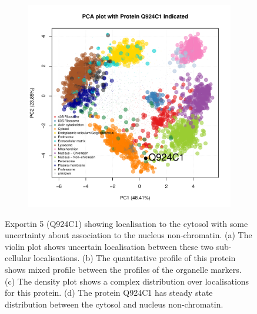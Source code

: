 \documentclass[12pt,english]{article}\usepackage[]{graphicx}\usepackage[]{color}
\makeatletter
\def\maxwidth{ %
  \ifdim\Gin@nat@width>\linewidth
    \linewidth
  \else
    \Gin@nat@width
  \fi
}
\newenvironment{knitrout}{}{} %
\makeatother
\begin{document}
\begin{figure}[h]
\begin{subfigure}[t]{0.5\textwidth}
\begin{knitrout}
{}



\end{knitrout}
    \caption{}
  \end{subfigure}%
  \begin{subfigure}[t]{0.5\textwidth}
    \centering
\begin{knitrout}
\color{fgcolor}
\includegraphics[width=\maxwidth]{figure/unnamed-chunk-15-1} 

\end{knitrout}
    \caption{}
  \end{subfigure}

  \caption{Exportin 5 (Q924C1) showing localisation to the cytosol
    with some uncertainty about association to the nucleus
    non-chromatin.  (a) The violin plot shows uncertain localisation
    between these two sub-cellular localisations. (b) The quantitative
    profile of this protein shows mixed profile between the profiles
    of the organelle markers. (c) The density plot shows a complex
    distribution over localisations for this protein. (d) The protein
    Q924C1 has steady state distribution between the cytosol and
    nucleus non-chromatin.}
  \label{fig:Q924C1}
\end{figure}
\end{document}
